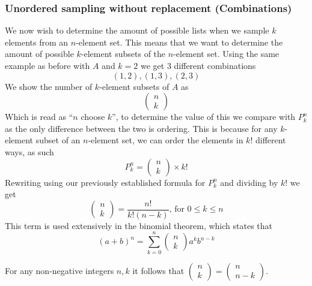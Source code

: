 \subsubsection{Unordered sampling without replacement (Combinations)}
We now wish to determine the amount of possible lists when we sample $k$ elements from an $n$-element set. This means that we want to determine the amount of possible $k$-element subsets of the $n$-element set. Using the same example as before with $A$ and $k=2$ we get 3 different combinations
\[
    (1,2),(1,3),(2,3)
\]
We show the number of $k$-element subsets of $A$ as
\[\begin{pmatrix}
  n \\
  k
 \end{pmatrix}\]
Which is read as ``$n$ choose $k$'', to determine the value of this we compare with $P_{k}^{n}$ as the only difference between the two is ordering. This is because for any $k$-element subset of an $n$-element set, we can order the elements in $k!$ different ways, as such
\[
    P_{k}^{n}=\begin{pmatrix}n\\k\end{pmatrix}\times k!
\]
Rewriting using our previously established formula for $P_{k}^{n}$ and dividing by $k!$ we get
\[
    \begin{pmatrix}n\\k\end{pmatrix}=\frac{n!}{k!(n-k)}\text{, for }0\leq k\leq n
\]
This term is used extensively in the binomial theorem, which states that
\[
    (a+b)^{n}=\sum_{k=0}^{n}\begin{pmatrix}n\\k\end{pmatrix}a^{k}b^{n-k}
\]
\begin{theorem}
    For any non-negative integers $n,k$ it follows that $\begin{pmatrix}n\\k\end{pmatrix}=\begin{pmatrix}n\\n-k\end{pmatrix}$.
\end{theorem}
